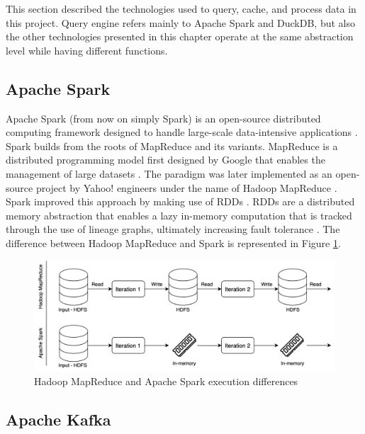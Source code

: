 This section described the technologies used to query, cache, and process data in this project. Query engine refers mainly to Apache Spark and DuckDB, but also the other technologies presented in this chapter operate at the same abstraction level while having different functions.

\subsection{Apache Spark}

Apache Spark (from now on simply Spark) is an open-source distributed computing framework designed to handle large-scale data-intensive applications \cite{zahariaApacheSparkUnified2016}. Spark builds from the roots of MapReduce and its variants. MapReduce is a distributed programming model first designed by Google that enables the management of large datasets \cite{dean2004mapreduce}. The paradigm was later implemented as an open-source project by Yahoo! engineers under the name of Hadoop MapReduce \cite{borthakurHadoopDistributedFile2005}. Spark improved this approach by making use of \glspl{RDD} \cite{Zaharia:EECS-2011-82}. \glspl{RDD} are a distributed memory abstraction that enables a lazy in-memory computation that is tracked through the use of lineage graphs, ultimately increasing fault tolerance \cite{Zaharia:EECS-2011-82}. The difference between Hadoop MapReduce and Spark is represented in Figure \ref{fig:MapReducevsSpark}.

\begin{figure}[!ht]
  \begin{center}
    \includegraphics[width=\textwidth]{figures/2-background/Spark_MapReduce.png}
  \end{center}
  \caption{Hadoop MapReduce and Apache Spark execution differences}
  \label{fig:MapReducevsSpark}
\end{figure}

\subsection{Apache Kafka}

